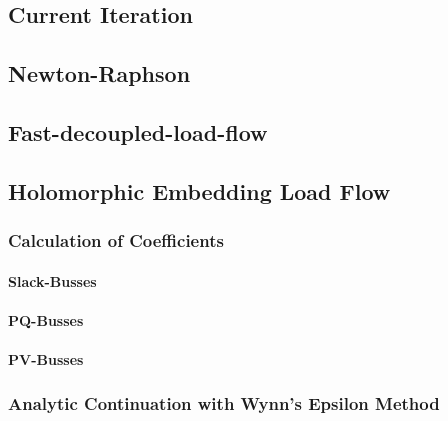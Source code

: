 \subsection{Current Iteration}
\label{sec:current_iteration}

\subsection{Newton-Raphson}
\label{sec:newton_raphson}

\subsection{Fast-decoupled-load-flow}
\label{sec:fdlf}

\subsection{Holomorphic Embedding Load Flow}
\label{sec:helm}

\subsubsection{Calculation of Coefficients}

\paragraph{Slack-Busses}

\paragraph{PQ-Busses}

\paragraph{PV-Busses}

\subsubsection{Analytic Continuation with Wynn's Epsilon Method}
